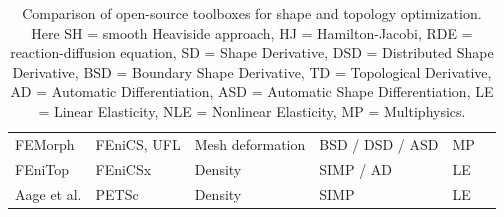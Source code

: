\documentclass[preprint,9pt]{elsarticle}
\begin{document}
\begin{table}[h]
\begin{tabularx}{\textwidth}{l l l l l l}
	FEMorph \cite{Schmidt1} 
	& FEniCS, UFL 
	& Mesh deformation 
	& BSD / DSD / ASD
	& MP \\

	FEniTop \cite{Jia2024} 
	& FEniCSx 	
	& Density 
	& SIMP / AD
	& LE \\

	Aage et al. \cite{MR3334238} 
	& PETSc 	
	& Density 
	& SIMP 
	& LE \\


	

	\bottomrule
	\end{tabularx}
	\caption{Comparison of open-source toolboxes for shape and topology optimization. Here SH = smooth Heaviside approach, HJ = Hamilton-Jacobi, RDE = reaction-diffusion equation,   SD = Shape Derivative, DSD = Distributed Shape Derivative, BSD = Boundary Shape Derivative,  TD = Topological Derivative, AD = Automatic Differentiation, ASD = Automatic Shape Differentiation, LE = Linear Elasticity, NLE = Nonlinear Elasticity, MP = Multiphysics. }
\label{tab1}
\end{table}
\end{document}
